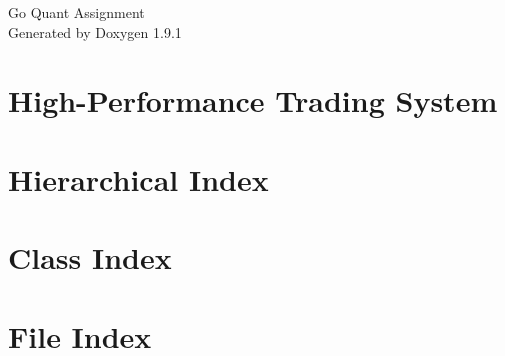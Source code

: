 \let\mypdfximage\pdfximage\def\pdfximage{\immediate\mypdfximage}\documentclass[twoside]{book}
\newcommand{\+}{\discretionary{\mbox{\scriptsize$\hookleftarrow$}}{}{}}
\newcommand{\clearemptydoublepage}{%
  \newpage{\pagestyle{empty}\cleardoublepage}%
}
\begin{document}
\raggedbottom

\hypersetup{pageanchor=false,
             bookmarksnumbered=true,
             pdfencoding=unicode
            }
\begin{titlepage}
\vspace*{7cm}
\begin{center}%
{\Large Go Quant Assignment }\\
\vspace*{1cm}
{\large Generated by Doxygen 1.9.1}\\
\end{center}
\end{titlepage}
\clearemptydoublepage
{}
\tableofcontents
\clearemptydoublepage
{}
\hypersetup{pageanchor=true}

\chapter{High-\/\+Performance Trading System}
\label{md_README}

\chapter{Hierarchical Index}

\chapter{Class Index}

\chapter{File Index}

\end{document}
